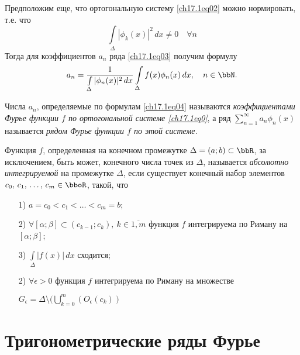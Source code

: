 Предположим еще, что ортогональную систему \eqref{ch17.1eq02} можно нормировать, т.е. что
$$
\int \limits_\Delta|\phi_k(x)|^2\,dx\ne 0 \quad \forall n
$$
Тогда для коэффициентов $a_n$ ряда \eqref{ch17.1eq03} получим формулу
\begin{equation} \label{ch17.1eq04}
a_n= \frac{1}{\int \limits_\Delta|\phi_n(x)|^2\,dx} \int \limits_\Delta f(x)\phi_n(x)\,dx, \quad n\in \bbN.
\end{equation}

\begin{defn}
Числа $a_n$, определяемые по формулам \eqref{ch17.1eq04} называются \textit{коэффициентами Фурье функции $f$ по ортогональной системе \eqref{ch17.1eq0}}, а ряд $\sum\limits_{n = 1}^{\infty} a_n \phi_n(x)$ называется \textit{рядом Фурье функции $f$ по этой системе.} 	
\end{defn}

\begin{defn} 
Функция $f$, определенная на конечном промежутке $\Delta=(a;b)\subset \bbR$, за исключением, быть может, конечного числа точек из $\Delta$, называется \textit{абсолютно интегрируемой} на промежутке $\Delta$, если существует конечный набор элементов $c_0, \,c_1,\,\ldots,\,c_m \in \bboR$, такой, что
\begin{enumerate}

\item[1)]	
$a=c_0<c_1<\ldots<c_m=b$;
\item[2)]
$\forall [\alpha;\beta]\subset(c_{k-1};c_k),\ k\in \overline{1,m}$ функция $f$ интегрируема по Риману на $[\alpha;\beta]$;	
\item[3)]
$\int \limits_\Delta |f(x)|\,dx$ сходится;
\item[2)]
$ \forall\epsilon>0$ функция $f$ интегрируема по Риману на множестве 

$G_{\epsilon}=\Delta \setminus (\bigcup \limits_{k=0}^{m}(O_{\epsilon}(c_k))$
\end{enumerate}	
\end{defn}
\section{Тригонометрические ряды Фурье}	
	
